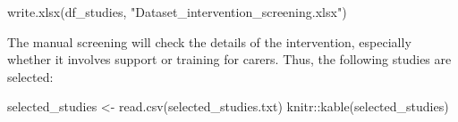 \documentclass[
]{article}
\newenvironment{Shaded}{\begin{snugshade}}{\end{snugshade}}
\newcommand{\FunctionTok}[1]{\textcolor[rgb]{0.00,0.00,0.00}{#1}}
\newcommand{\NormalTok}[1]{#1}
\newcommand{\OtherTok}[1]{\textcolor[rgb]{0.56,0.35,0.01}{#1}}
\newcommand{\SpecialCharTok}[1]{\textcolor[rgb]{0.00,0.00,0.00}{#1}}
\newcommand{\StringTok}[1]{\textcolor[rgb]{0.31,0.60,0.02}{#1}}
\begin{document}
\begin{Shaded}
\begin{Highlighting}[]
\FunctionTok{write.xlsx}\NormalTok{(df\_studies, }\StringTok{"Dataset\_intervention\_screening.xlsx"}\NormalTok{)}
\end{Highlighting}
\end{Shaded}

The manual screening will check the details of the intervention,
especially whether it involves support or training for carers. Thus, the
following studies are selected:

\begin{Shaded}
\begin{Highlighting}[]
\NormalTok{selected\_studies }\OtherTok{\textless{}{-}} \FunctionTok{read.csv}\NormalTok{(}\StringTok{\textquotesingle{}selected\_studies.txt\textquotesingle{}}\NormalTok{)}
\NormalTok{knitr}\SpecialCharTok{::}\FunctionTok{kable}\NormalTok{(selected\_studies)}
\end{Highlighting}
\end{Shaded}
\end{document}
